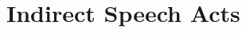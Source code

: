 \documentclass[a4paper,landscape,headrule,footrule,xetex]{foils}
\begin{document}
 

\section{Indirect Speech Acts}
\end{document}
